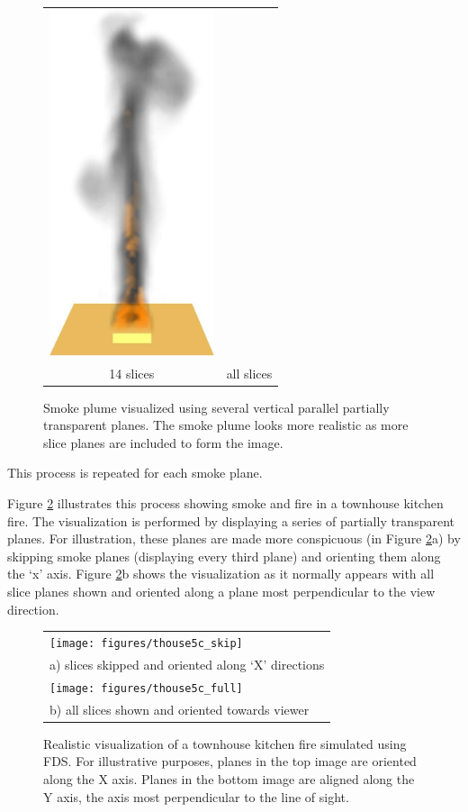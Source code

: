 {\begin{figure}[\figoptions]
\begin{center}
\begin{tabular}{cc}
\includegraphics[height=4.0in]{figures/splume_11_27}\\
14 slices&all slices
\end{tabular}
\end{center}
\caption [Smoke plume visualized using several vertical parallel
partially transparent planes.] {Smoke plume visualized using
several vertical parallel partially transparent planes. The smoke
plume looks more realistic as more slice planes
are included to form the image. } \label{figplume}
\end{figure}

\noindent This process is repeated for each smoke plane.

Figure \ref{figsmoke3d} illustrates this process showing smoke and fire in a townhouse kitchen fire. The visualization is performed by displaying a series of partially transparent planes. For illustration, these planes are made more conspicuous (in Figure \ref{figsmoke3d}a) by skipping smoke planes (displaying every third plane) and orienting them along the `x' axis. Figure \ref{figsmoke3d}b shows the visualization as it normally appears with all slice planes shown and oriented along a
plane most perpendicular to the view direction.

\begin{figure}[\figoptions]
\begin{center}
\begin{tabular}{l}
\texttt{[image: figures/thouse5c\_skip]}\\
a) slices skipped and oriented along `X' directions\\
\texttt{[image: figures/thouse5c\_full]}\\
b) all slices shown and oriented towards viewer \\
\end{tabular}
\end{center}
\caption[Realistic visualization of a townhouse kitchen fire simulated using FDS.]{Realistic visualization of a townhouse kitchen fire simulated using FDS. For illustrative purposes, planes in the top image are oriented along the X axis.  Planes in the bottom image are aligned along the Y axis, the axis most perpendicular to the line of sight.}
\label{figsmoke3d}%
\end{figure}

}
